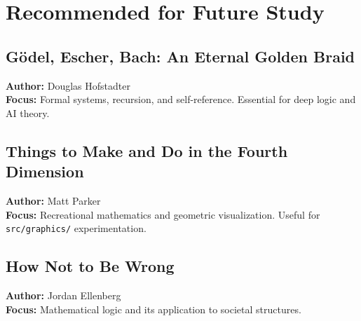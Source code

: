 \documentclass[11pt]{article}
\begin{document}
\section{Recommended for Future Study}

\subsection*{Gödel, Escher, Bach: An Eternal Golden Braid}
\textbf{Author:} Douglas Hofstadter \\
\textbf{Focus:} Formal systems, recursion, and self-reference. Essential for deep logic and AI theory.

\subsection*{Things to Make and Do in the Fourth Dimension}
\textbf{Author:} Matt Parker \\
\textbf{Focus:} Recreational mathematics and geometric visualization. Useful for \texttt{src/graphics/} experimentation.

\subsection*{How Not to Be Wrong}
\textbf{Author:} Jordan Ellenberg \\
\textbf{Focus:} Mathematical logic and its application to societal structures.
\end{document}
